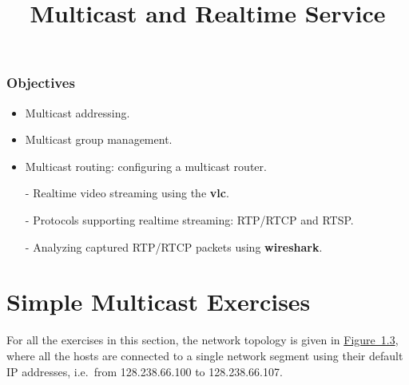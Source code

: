 \documentclass{../UTNetLab}
\title{Multicast and Realtime Service}
\begin{document}
\section*{Objectives}
\begin{itemize}
    \item Multicast addressing.
    \item Multicast group management.
    \item Multicast routing: configuring a multicast router.
    \item [-] Realtime video streaming using the \textbf{vlc}.
    \item [-] Protocols supporting realtime streaming: RTP/RTCP and RTSP.
    \item [-] Analyzing captured RTP/RTCP packets using \textbf{wireshark}.
\end{itemize}

\part{Simple Multicast Exercises}
For all the exercises in this section, the network topology is given in \hyperref[fig:1.3]{Figure~1.3}, where all the hosts are connected to a single network segment using their default IP addresses, i.e.\ from 128.238.66.100 to 128.238.66.107.
\end{document}
